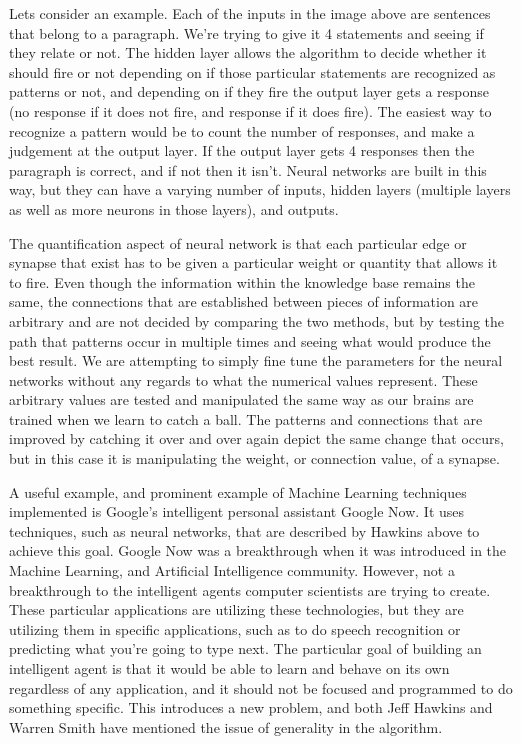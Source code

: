 \documentclass[11pt, oneside]{article}
\begin{document}
\par Lets consider an example. Each of the inputs in the image above are sentences that belong to a paragraph. We're trying to give it 4 statements and seeing if they relate or not. The hidden layer allows the algorithm to decide whether it should fire or not depending on if those particular statements are recognized as patterns or not, and depending on if they fire the output layer gets a response (no response if it does not fire, and response if it does fire). The easiest way to recognize a pattern would be to count the number of responses, and make a judgement at the output layer. If the output layer gets 4 responses then the paragraph is correct, and if not then it isn't. Neural networks are built in this way, but they can have a varying number of inputs, hidden layers (multiple layers as well as more neurons in those layers), and outputs. 

\par The quantification aspect of neural network is that each particular edge or synapse that exist has to be given a particular weight or quantity that allows it to fire. Even though the information within the knowledge base remains the same, the connections that are established between pieces of information are arbitrary and are not decided by comparing the two methods, but by testing the path that patterns occur in multiple times and seeing what would produce the best result. We are attempting to simply fine tune the parameters for the neural networks without any regards to what the numerical values represent. These arbitrary values are tested and manipulated the same way as our brains are trained when we learn to catch a ball. The patterns and connections that are improved by catching it over and over again depict the same change that occurs, but in this case it is manipulating the weight, or connection value, of a synapse. 

\par A useful example, and prominent example of Machine Learning techniques implemented is Google's intelligent personal assistant Google Now. It uses techniques, such as neural networks, that are described by Hawkins above to achieve this goal. Google Now was a breakthrough when it was introduced in the Machine Learning, and Artificial Intelligence community. However, not a breakthrough to the intelligent agents computer scientists are trying to create. These particular applications are utilizing these technologies, but they are utilizing them in specific applications, such as to do speech recognition or predicting what you're going to type next. The particular goal of building an intelligent agent is that it would be able to learn and behave on its own regardless of any application, and it should not be focused and programmed to do something specific. This introduces a new problem, and both Jeff Hawkins and Warren Smith have mentioned the issue of generality in the algorithm.
\end{document}
